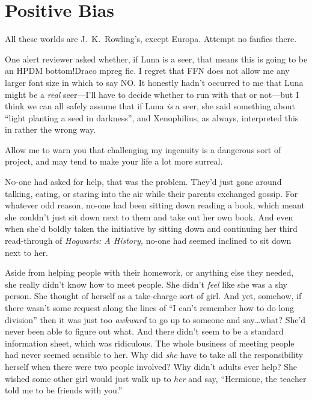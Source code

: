\chapter{Positive Bias}

\begin{chapterOpeningAuthorNote}
All these worlds are J.~K.~Rowling's, except Europa. Attempt no fanfics there.

One alert reviewer asked whether, if Luna is a seer, that means this is going to be an HPDM bottom!Draco mpreg fic. I regret that FFN does not allow me any larger font size in which to say NO. It honestly hadn't occurred to me that Luna might be a \emph{real} seer—I'll have to decide whether to run with that or not—but I think we can all safely assume that if Luna \emph{is} a seer, she said something about “light planting a seed in darkness”, and Xenophilius, as always, interpreted this in rather the wrong way.
\end{chapterOpeningAuthorNote}
\begin{chapterOpeningQuote}
Allow me to warn you that challenging my ingenuity is a dangerous sort of project, and may tend to make your life a lot more surreal.
\end{chapterOpeningQuote}

\lettrine{N}{o}-one had asked for help, that was the problem. They’d just gone around talking, eating, or staring into the air while their parents exchanged gossip. For whatever odd reason, no-one had been sitting down reading a book, which meant she couldn’t just sit down next to them and take out her own book. And even when she’d boldly taken the initiative by sitting down and continuing her third read-through of \emph{Hogwarts: A History,} no-one had seemed inclined to sit down next to her.

Aside from helping people with their homework, or anything else they needed, she really didn’t know how to meet people. She didn’t \emph{feel} like she was a shy person. She thought of herself as a take-charge sort of girl. And yet, somehow, if there wasn’t some request along the lines of “I can’t remember how to do long division” then it was just too \emph{awkward} to go up to someone and say…what? She’d never been able to figure out what. And there didn’t seem to be a standard information sheet, which was ridiculous. The whole business of meeting people had never seemed sensible to her. Why did \emph{she} have to take all the responsibility herself when there were two people involved? Why didn’t adults ever help? She wished some other girl would just walk up to \emph{her} and say, “Hermione, the teacher told me to be friends with you.”

